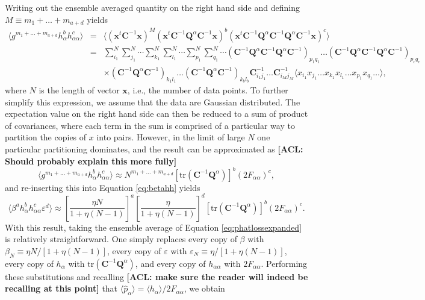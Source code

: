 \documentclass[preprint2,numberedappendix,tighten]{aastex6}  %
\newcommand{\x}{\mathbf{x}}
\newcommand{\C}{\mathbf{C}}
\newcommand{\Q}{\mathbf{Q}}
\newcommand{\acl}[1]{{\color{red} \textbf{[ACL:  #1]}}}
\begin{document}
Writing out the ensemble averaged quantity on the right hand side and defining $M \equiv m_1 + \dots + m_{a+d}$ yields
\begin{eqnarray}
\langle g^{m_1 + \dots + m_{a+d}} h_\alpha^b h_{\alpha \alpha}^c \rangle &=& \langle (\x^t \C^{-1} \x)^M (\x^t \C^{-1} \Q^\alpha \C^{-1} \x)^b (\x^t \C^{-1} \Q^\alpha \C^{-1} \Q^\alpha \C^{-1}\x )^c \rangle \nonumber \\
&=& \sum_{i_1}^N \sum_{j_1}^N \cdots  \sum_{k_1}^N \sum_{l_1}^N \cdots  \sum_{p_1}^N \sum_{q_1}^N \cdots  ( \C^{-1} \Q^\alpha \C^{-1} \Q^\alpha \C^{-1} )_{p_1 q_1} \dots (\C^{-1} \Q^\alpha \C^{-1} \Q^\alpha \C^{-1})_{p_c q_c}  \nonumber \\
&&  \times ( \C^{-1} \Q^\alpha \C^{-1})_{k_1 l_1} \dots ( \C^{-1} \Q^\alpha \C^{-1})_{k_b l_b} \C^{-1}_{i_1 j_1}\dots \C^{-1}_{i_M j_M} \langle x_{i_1} x_{j_1} \dots   x_{k_1} x_{l_1} \dots  x_{p_1} x_{q_1} \dots \rangle, \quad
\end{eqnarray}
where $N$ is the length of vector $\x$, i.e., the number of data points. To further simplify this expression, we assume that the data are Gaussian distributed. The expectation value on the right hand side can then be reduced to a sum of product of covariances, where each term in the sum is comprised of a particular way to partition the copies of $x$ into pairs. However, in the limit of large $N$ one particular partitioning dominates, and the result can be approximated as \acl{Should probably explain this more fully}
\begin{equation}
\langle g^{m_1 + \dots + m_{a+d}} h_\alpha^b h_{\alpha \alpha}^c \rangle \approx N^{m_1 + \dots + m_{a+d}} \left[ \textrm{tr} (\C^{-1} \Q^\alpha )\right]^b (2 F_{\alpha \alpha})^c,
\end{equation}
and re-inserting this into Equation \eqref{eq:betahh} yields
\begin{equation}
\langle \beta^a h_\alpha^b h_{\alpha \alpha}^c \varepsilon^d \rangle \approx \left[ \frac{\eta N}{1+\eta (N-1)} \right]^a \left[ \frac{\eta }{1+\eta (N-1)} \right]^d \left[ \textrm{tr} (\C^{-1} \Q^\alpha )\right]^b (2 F_{\alpha \alpha})^c.
\end{equation}
With this result, taking the ensemble average of Equation \eqref{eq:phatlossexpanded} is relatively straightforward. One simply replaces every copy of $\beta$ with $\beta_N \equiv \eta N / [1 + \eta (N-1)]$, every copy of $\varepsilon$ with $\varepsilon_N \equiv  \eta  / [1 + \eta (N-1)]$, every copy of $h_\alpha$ with $ \textrm{tr} (\C^{-1} \Q^\alpha )$, and every copy of $h_{\alpha \alpha}$ with $2F_{\alpha \alpha}$. Performing these substitutions and recalling \acl{make sure the reader will indeed be recalling at this point} that $\langle \hat{p}_\alpha \rangle = \langle h_\alpha \rangle / 2 F_{\alpha \alpha}$, we obtain
\end{document}
